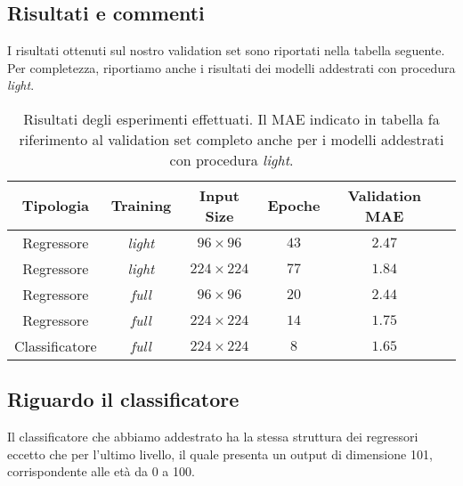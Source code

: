 \subsection{Risultati e commenti}

I risultati ottenuti sul nostro validation set sono riportati nella tabella seguente. Per completezza, riportiamo anche i risultati dei modelli addestrati con procedura \emph{light}.

\begin{table}[ht]
    \centering
    \begin{tabular}{ |c|c|c|c|c|c| } 
        \hline
        \textbf{Tipologia} & \textbf{Training} & \textbf{Input Size} & \textbf{Epoche} & \textbf{Validation MAE} \\
        \hline
        Regressore & \emph{light} & $96 \times 96$  & $43$ & $2.47$ \\
        \hline
        Regressore & \emph{light} & $224 \times 224$ & $77$ & $1.84$ \\
        \hline
        Regressore & \emph{full} & $96 \times 96$  & $20$ & $2.44$ \\
        \hline
        Regressore & \emph{full} & $224 \times 224$ & $14$ & $1.75$ \\
        \hline   
        Classificatore & \emph{full} & $224 \times 224$ & $8$ & $1.65$ \\
        \hline
    \end{tabular}
    \caption{Risultati degli esperimenti effettuati. Il MAE indicato in tabella fa riferimento al validation set completo anche per i modelli addestrati con procedura \emph{light}.}
\end{table}

\subsection{Riguardo il classificatore}

Il classificatore che abbiamo addestrato ha la stessa struttura dei regressori eccetto che per l'ultimo livello, il quale presenta un output di dimensione 101, corrispondente alle età da 0 a 100. 

